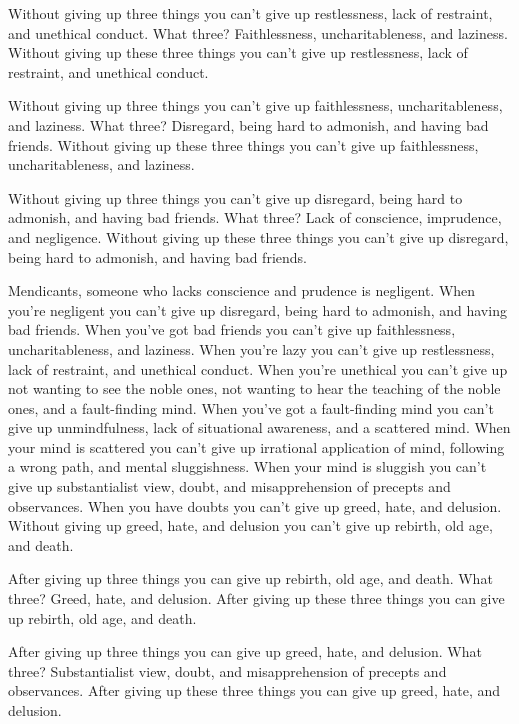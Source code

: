 \documentclass[12pt,openany]{book}%
\begin{document}
Without giving up three things you can’t give up restlessness, lack of restraint, and unethical conduct. What three? Faithlessness, uncharitableness, and laziness. Without giving up these three things you can’t give up restlessness, lack of restraint, and unethical conduct. 

Without giving up three things you can’t give up faithlessness, uncharitableness, and laziness. What three? Disregard, being hard to admonish, and having bad friends. Without giving up these three things you can’t give up faithlessness, uncharitableness, and laziness. 

Without giving up three things you can’t give up disregard, being hard to admonish, and having bad friends. What three? Lack of conscience, imprudence, and negligence. Without giving up these three things you can’t give up disregard, being hard to admonish, and having bad friends. 

Mendicants, someone who lacks conscience and prudence is negligent. When you’re negligent you can’t give up disregard, being hard to admonish, and having bad friends. When you’ve got bad friends you can’t give up faithlessness, uncharitableness, and laziness. When you’re lazy you can’t give up restlessness, lack of restraint, and unethical conduct. When you’re unethical you can’t give up not wanting to see the noble ones, not wanting to hear the teaching of the noble ones, and a fault-finding mind. When you’ve got a fault-finding mind you can’t give up unmindfulness, lack of situational awareness, and a scattered mind. When your mind is scattered you can’t give up irrational application of mind, following a wrong path, and mental sluggishness. When your mind is sluggish you can’t give up substantialist view, doubt, and misapprehension of precepts and observances. When you have doubts you can’t give up greed, hate, and delusion. Without giving up greed, hate, and delusion you can’t give up rebirth, old age, and death. 

After giving up three things you can give up rebirth, old age, and death. What three? Greed, hate, and delusion. After giving up these three things you can give up rebirth, old age, and death. 

After giving up three things you can give up greed, hate, and delusion. What three? Substantialist view, doubt, and misapprehension of precepts and observances. After giving up these three things you can give up greed, hate, and delusion. 
\end{document}
